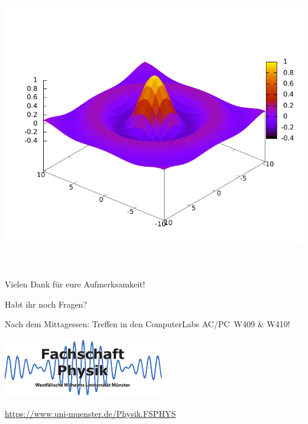 \begin{frame}[<+->][fragile]
\begin{columns}
		\hspace*{-0.02\textwidth}
		\hspace*{-0.02\textwidth}
		\includegraphics[width=\textwidth]{res/gnuplot_pm3d.pdf}
	\end{columns}
\end{frame}

\section*{}
\subsection*{}

\begin{frame}
	\begin{block}{}
		\centering
		Vielen Dank für eure Aufmerksamkeit!
	\end{block}

	\begin{block}{}
		\centering
		Habt ihr noch Fragen?
	\end{block}
	
	\begin{block}{}
		\centering\LARGE
		Nach dem Mittagessen: Treffen in den ComputerLabs AC/PC~W409 \& W410!
	\end{block}

	\begin{center}
		\includegraphics[width=7cm]{res/logo.pdf}
		
		\medskip
		\url{https://www.uni-muenster.de/Physik.FSPHYS}
	\end{center}
\end{frame}


